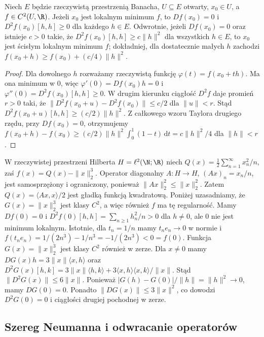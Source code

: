 \begin{stwierdzenie}
\label{prop:extremum15}
Niech $E$ będzie rzeczywistą przestrzenią Banacha, $U\subseteq E$ otwarty, $x_0\in U$, a $f\in C^2(U,\R)$. Jeżeli $x_0$ jest lokalnym minimum $f$, to $Df(x_0)=0$ i $D^2f(x_0)[h,h]\ge0$ dla każdego $h\in E$. Odwrotnie, jeżeli $Df(x_0)=0$ oraz istnieje $c>0$ takie, że $D^2f(x_0)[h,h]\ge c\|h\|^2$ dla wszystkich $h\in E$, to $x_0$ jest ścisłym lokalnym minimum $f$; dokładniej, dla dostatecznie małych $h$ zachodzi $f(x_0+h)\ge f(x_0)+(c/4)\|h\|^2$.
\end{stwierdzenie}
\begin{proof}
Dla dowolnego $h$ rozważamy rzeczywistą funkcję $\varphi(t)=f(x_0+th)$. Ma ona minimum w $0$, więc $\varphi'(0)=Df(x_0)h=0$ i $\varphi''(0)=D^2f(x_0)[h,h]\ge0$. W drugim kierunku ciągłość $D^2f$ daje promień $r>0$ taki, że $\|D^2f(x_0+u)-D^2f(x_0)\|\le c/2$ dla $\|u\|<r$. Stąd $D^2f(x_0+u)[h,h]\ge(c/2)\|h\|^2$. Z całkowego wzoru Taylora drugiego rzędu, przy $Df(x_0)=0$, otrzymujemy $f(x_0+h)-f(x_0)\ge(c/2)\|h\|^2\int_0^1(1-t)\,\mathrm dt=c\|h\|^2/4$ dla $\|h\|<r$.
\end{proof}

\begin{przyklad}
\label{ex:positive-hessian15}
W rzeczywistej przestrzeni Hilberta $H=\ell^2(\N;\R)$ niech
$Q(x)=\frac12\sum_{n=1}^\infty x_n^2/n$, zaś $f(x)=Q(x)-\|x\|_2^3$. Operator diagonalny $A:H\to H$, $(Ax)_n=x_n/n$, jest samosprzężony i ograniczony, ponieważ $\|Ax\|_2^2\le\|x\|_2^2$. Zatem $Q(x)=\langle Ax,x\rangle/2$ jest gładką funkcją kwadratową. Poniżej uzasadniamy, że $G(x)=\|x\|_2^3$ jest klasy $C^2$, a więc również $f$ ma tę regularność. Mamy $Df(0)=0$ i $D^2f(0)[h,h]=\sum_{n\ge1}h_n^2/n>0$ dla $h\ne0$, ale $0$ nie jest minimum lokalnym. Istotnie, dla $t_n=1/n$ mamy $t_ne_n\to0$ w normie i $f(t_ne_n)=1/(2n^3)-1/n^3=-1/(2n^3)<0=f(0)$. Funkcja $G(x)=\|x\|_2^3$ jest klasy $C^2$ również w zerze. Dla $x\ne0$ mamy
$DG(x)h=3\|x\|\langle x,h\rangle$ oraz
$D^2G(x)[h,k]=3\|x\|\langle h,k\rangle+3\langle x,h\rangle\langle x,k\rangle/\|x\|$.
Stąd $\|D^2G(x)\|\le6\|x\|$. Ponieważ $|G(h)-G(0)|/\|h\|=\|h\|^2\to0$, mamy $DG(0)=0$. Ponadto $\|DG(x)\|\le3\|x\|^2$, co dowodzi $D^2G(0)=0$ i ciągłości drugiej pochodnej w zerze.
\end{przyklad}

\subsection{Szereg Neumanna i odwracanie operatorów}

